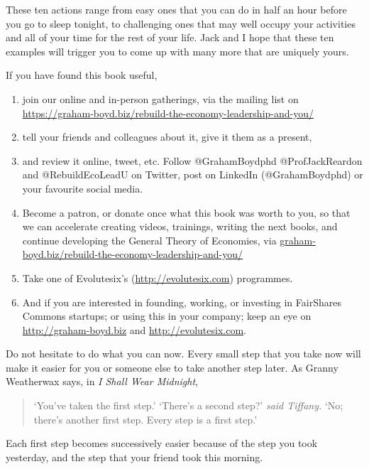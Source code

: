 These ten actions range from easy ones that you can do in half an hour before you go to sleep tonight, to challenging ones that may well occupy your activities and all of your time for the rest of your life. Jack and I hope that these ten examples will trigger you to come up with many more that are uniquely yours.


If you have found this book useful, 


\begin{enumerate}
\item join our online and in-person gatherings, via the mailing list on \url{https://graham-boyd.biz/rebuild-the-economy-leadership-and-you/} 
\item tell your friends and colleagues about it, give it them as a present, 
\item and review it online, tweet, etc. Follow @GrahamBoydphd @ProfJackReardon and \newline @RebuildEcoLeadU on Twitter, post on LinkedIn (@GrahamBoydphd) or your favourite social media.
\item Become a patron, or donate once what this book was worth to you, so that we can accelerate creating videos, trainings, writing the next books, and continue developing the General Theory of Economies, via \url{graham-boyd.biz/rebuild-the-economy-leadership-and-you/} 
\item Take one of Evolutesix’s (\url{http://evolutesix.com}) programmes.
\item And if you are interested in founding, working, or investing in FairShares Commons startups; or using this in your company; keep an eye on \newline \url{http://graham-boyd.biz} and \url{http://evolutesix.com}.
\end{enumerate}


Do not hesitate to do what you can now. Every small step that you take now will make it easier for you or someone else to take another step later. As Granny Weatherwax says, in \emph{I Shall Wear Midnight}\cite{pratchett-wear-midnight}, 
\begin{quote}
‘You've taken the first step.’ \newline
‘There's a second step?’ \emph{said Tiffany.} \newline
‘No; there's another first step. Every step is a first step.’
\end{quote}
Each first step becomes successively easier because of the step you took yesterday, and the step that your friend took this morning. 


